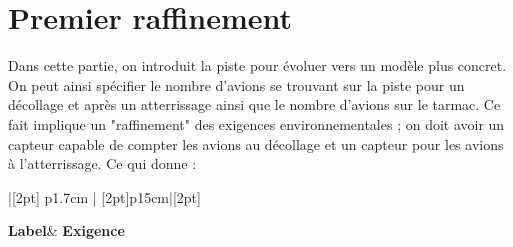 \section{Premier raffinement}

Dans cette partie, on introduit la piste pour évoluer vers un modèle plus concret. On peut ainsi spécifier  le nombre d'avions se trouvant sur la piste pour un décollage et après un atterrissage ainsi que le nombre d'avions sur le tarmac.
Ce fait implique un "raffinement" des exigences environnementales ; on doit avoir un capteur capable de compter les avions au décollage et un capteur pour les avions à l'atterrissage. Ce qui donne :


\begin{table} [H]
	\centering
{}
\begin{tabu}{|[2pt] p{1.7cm} | [2pt]p{15cm}|[2pt]}
	
	\tabucline[2pt]{-} 
	\Centering	\textbf{Label}& \Centering \textbf{Exigence}  \\ \tabucline[2pt]{-}
	

\end{tabu}
\end{table}
